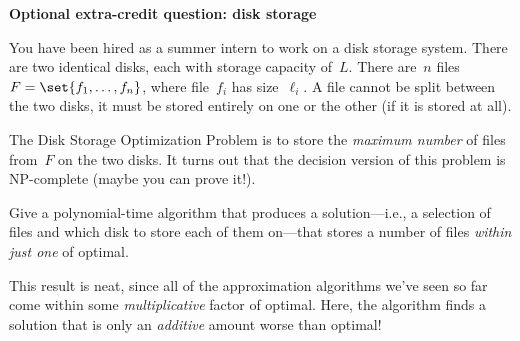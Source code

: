 \documentclass[11pt,addpoints]{exam}
\begin{document}
\begin{questions}

  \bonusquestion[5] \textbf{Optional extra-credit question: disk storage}

  You have been hired as a summer intern to work on a disk storage system.
  There are two identical disks, each with storage capacity of~$L$.
  There are~$n$ files $F = \set{f_1, \dots, f_n }$, where file~$f_i$ has size~$\ell_{i}$.
  A file cannot be split between the two disks, it must be stored entirely on one or the other (if it is stored at all).

  The Disk Storage Optimization Problem is to store the \emph{maximum number} of files from~$F$ on the two disks.
  It turns out that the decision version of this problem is NP-complete (maybe you can prove it!).

  Give a polynomial-time algorithm that produces a solution---i.e., a selection of files and which disk to store each of them on---that stores a number of files \emph{within just one} of optimal.

  This result is neat, since all of the approximation algorithms we've seen so far come within some \emph{multiplicative} factor of optimal.
  Here, the algorithm finds a solution that is only an \emph{additive} amount worse than optimal!

  \begin{solution}

  \end{solution}
  
\end{questions}
\end{document}
